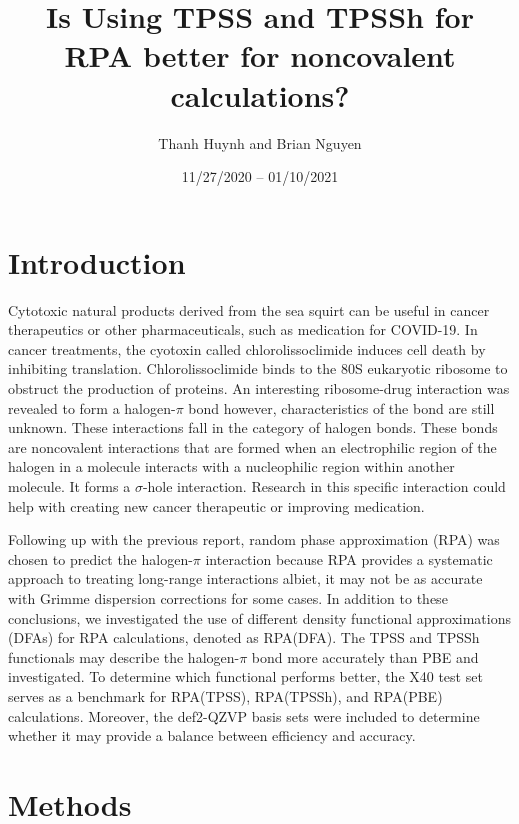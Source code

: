 \documentclass[11pt]{article}
\title{\textbf{Is Using TPSS and TPSSh for RPA better for noncovalent
    calculations?}}
\author{Thanh Huynh and Brian Nguyen}
\date{11/27/2020 -- 01/10/2021 }
\begin{document}
\maketitle

\section{Introduction}

Cytotoxic natural products derived from the sea squirt can be useful in cancer
therapeutics or other pharmaceuticals, such as medication
for COVID-19.\autocite{White926,Könst.Szklarski:Translation-inhibition-lissoclimides.NCAH.17}
In cancer treatments, the cyotoxin called chlorolissoclimide induces cell death
by inhibiting translation.\autocite{Könst.Szklarski:Translation-inhibition-lissoclimides.NCAH.17}
Chlorolissoclimide binds to the 80S eukaryotic
ribosome to obstruct the production of proteins. An interesting ribosome-drug
interaction was revealed to form a halogen-$\pi$ bond however,
characteristics of the bond are still unknown. These interactions fall in
the category of halogen bonds. These bonds are noncovalent interactions that
are formed when an electrophilic region of the halogen in a molecule interacts
with a nucleophilic region within another molecule. It forms a $\sigma$-hole
interaction.\autocite{doi:10.1021/acs.chemrev.5b00484} Research in this specific
interaction could help with creating new cancer therapeutic or improving medication.

Following up with the previous report, random phase approximation (RPA) was
chosen to predict the halogen-$\pi$ interaction because RPA provides a
systematic approach to treating long-range interactions albiet, it may
not be as accurate with Grimme dispersion corrections for some cases. In addition to
these conclusions, we investigated the use of different density functional
approximations (DFAs) for RPA calculations, denoted as RPA(DFA).
The TPSS and TPSSh functionals\autocite{Tao.Perdew:Nonempirical-Meta-GGA.PRLT.03,
  doi:10.1063/1.1665298}
may describe the halogen-$\pi$ bond more accurately
than PBE and investigated. To determine which functional performs better,
the X40 test set serves as a benchmark for RPA(TPSS), RPA(TPSSh), and
RPA(PBE) calculations. Moreover, the def2-QZVP basis sets\autocite{Weigend.Ahlrichs:Balanced-basis-sets.PPCP.05}
were included to determine whether it may provide a balance between efficiency
and accuracy.

\section{Methods}
\end{document}
